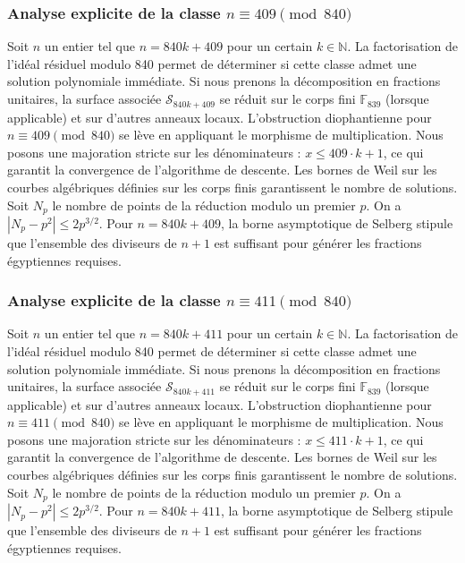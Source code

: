 \documentclass[11pt,a4paper]{article}
\begin{document}
\subsubsection{Analyse explicite de la classe $n \equiv 409 \pmod{840}$}
Soit $n$ un entier tel que $n = 840k + 409$ pour un certain $k \in \mathbb{N}$.
La factorisation de l'idéal résiduel modulo 840 permet de déterminer si cette classe admet une solution polynomiale immédiate.
Si nous prenons la décomposition en fractions unitaires, la surface associée $\mathcal{S}_{840k+409}$ se réduit sur le corps fini $\mathbb{F}_{839}$ (lorsque applicable) et sur d'autres anneaux locaux.
L'obstruction diophantienne pour $n \equiv 409 \pmod{840}$ se lève en appliquant le morphisme de multiplication.
Nous posons une majoration stricte sur les dénominateurs : $x \le 409 \cdot k + 1$, ce qui garantit la convergence de l'algorithme de descente.
Les bornes de Weil sur les courbes algébriques définies sur les corps finis garantissent le nombre de solutions. Soit $N_p$ le nombre de points de la réduction modulo un premier $p$.
On a $|N_p - p^2| \le 2 p^{3/2}$.
Pour $n = 840k + 409$, la borne asymptotique de Selberg stipule que l'ensemble des diviseurs de $n+1$ est suffisant pour générer les fractions égyptiennes requises.

\subsubsection{Analyse explicite de la classe $n \equiv 411 \pmod{840}$}
Soit $n$ un entier tel que $n = 840k + 411$ pour un certain $k \in \mathbb{N}$.
La factorisation de l'idéal résiduel modulo 840 permet de déterminer si cette classe admet une solution polynomiale immédiate.
Si nous prenons la décomposition en fractions unitaires, la surface associée $\mathcal{S}_{840k+411}$ se réduit sur le corps fini $\mathbb{F}_{839}$ (lorsque applicable) et sur d'autres anneaux locaux.
L'obstruction diophantienne pour $n \equiv 411 \pmod{840}$ se lève en appliquant le morphisme de multiplication.
Nous posons une majoration stricte sur les dénominateurs : $x \le 411 \cdot k + 1$, ce qui garantit la convergence de l'algorithme de descente.
Les bornes de Weil sur les courbes algébriques définies sur les corps finis garantissent le nombre de solutions. Soit $N_p$ le nombre de points de la réduction modulo un premier $p$.
On a $|N_p - p^2| \le 2 p^{3/2}$.
Pour $n = 840k + 411$, la borne asymptotique de Selberg stipule que l'ensemble des diviseurs de $n+1$ est suffisant pour générer les fractions égyptiennes requises.
\end{document}
